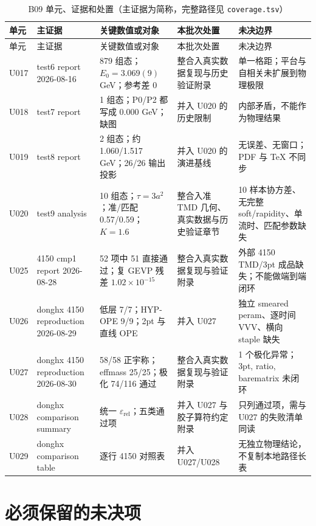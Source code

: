 \begingroup
\setlength{\tabcolsep}{3pt}
\begin{longtable}{@{}p{}p{}p{}p{}p{}@{}}
\caption{B09 单元、证据和处置（主证据为简称，完整路径见 \texttt{coverage.tsv}）}\label{tab:b09-evidence-matrix}\\
\hline
单元 & 主证据 & 关键数值或对象 & 本批次处置 & 未决边界 \\
\hline
\endfirsthead
\hline
单元 & 主证据 & 关键数值或对象 & 本批次处置 & 未决边界 \\
\hline
\endhead
U017 & test6 report 2026-08-16 & 879 组态；\(E_0=3.069(9)\) GeV；参考差 0 & 整合入真实数据复现与历史验证附录 & 单一格距；平台与自相关未扩展到物理极限 \\
\hline
U018 & test7 report & 1 组态；P0/P2 都写成 0.000 GeV；缺图 & 并入 U020 的历史限制 & 内部矛盾，不能作为物理结果 \\
\hline
U019 & test8 report & 2 组态；约 1.060/1.517 GeV；26/26 输出投影 & 并入 U020 的演进基线 & 无误差、无窗口；PDF 与 TeX 不同步 \\
\hline
U020 & test9 analysis & 10 组态；\(\tau=3a^2\)；准/匹配 0.57/0.59；\(K=1.6\) & 整合入准 TMD 几何、真实数据与历史验证章节 & 10 样本协方差、无完整 soft/rapidity、单流时、匹配参数缺失 \\
\hline
U025 & 4150 cmp1 report 2026-08-28 & 52 项中 51 直接通过；复 GEVP 残差 \(1.02\times10^{-15}\) & 整合入真实数据复现与验证附录 & 外部 4150 TMD/3pt 成品缺失；不能做端到端闭环 \\
\hline
U026 & donghx 4150 reproduction 2026-08-29 & 低层 7/7；HYP-OPE 9/9；2pt 与直线 OPE & 并入 U027 & 独立 smeared peram、逐时间 VVV、横向 staple 缺失 \\
\hline
U027 & donghx 4150 reproduction 2026-08-30 & 58/58 正宇称；effmass 25/25；极化 74/116 通过 & 整合入真实数据复现与验证附录 & 1 个极化异常；3pt, ratio, barematrix 未闭环 \\
\hline
U028 & donghx comparison summary & 统一 \(\varepsilon_{\mathrm{rel}}\)；五类通过项 & 并入 U027 与胶子算符约定附录 & 只列通过项，需与 U027 的失败清单同读 \\
\hline
U029 & donghx comparison table & 逐行 4150 对照表 & 并入 U027/U028 & 无独立物理结论，不复制本地路径长表 \\
\hline
\end{longtable}
\endgroup

\section{必须保留的未决项}

